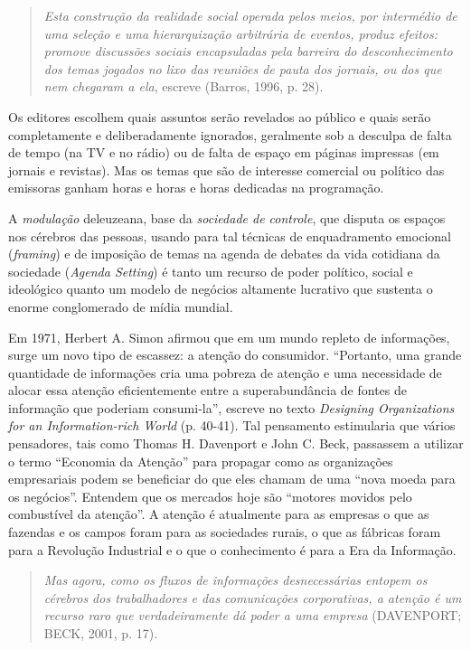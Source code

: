 \begin{quote}
\emph{Esta construção da realidade social operada pelos meios, por
intermédio de uma seleção e uma hierarquização arbitrária de eventos,
produz efeitos: promove discussões sociais encapsuladas pela barreira do
desconhecimento dos temas jogados no lixo das reuniões de pauta dos
jornais, ou dos que nem chegaram a ela}, escreve (Barros, 1996, p. 28).
\end{quote}

Os editores escolhem quais assuntos serão revelados ao público e quais
serão completamente e deliberadamente ignorados, geralmente sob a
desculpa de falta de tempo (na TV e no rádio) ou de falta de espaço em
páginas impressas (em jornais e revistas). Mas os temas que são de
interesse comercial ou político das emissoras ganham horas e horas e
horas dedicadas na programação.

A \emph{modulação} deleuzeana, base da \emph{sociedade de controle}, que
disputa os espaços nos cérebros das pessoas, usando para tal técnicas de
enquadramento emocional (\emph{framing}) e de imposição de temas na
agenda de debates da vida cotidiana da sociedade (\emph{Agenda Setting})
é tanto um recurso de poder político, social e ideológico quanto um
modelo de negócios altamente lucrativo que sustenta o enorme
conglomerado de mídia mundial.

Em 1971, Herbert A. Simon afirmou que em um mundo repleto de
informações, surge um novo tipo de escassez: a atenção do consumidor.
``Portanto, uma grande quantidade de informações cria uma pobreza de
atenção e uma necessidade de alocar essa atenção eficientemente entre a
superabundância de fontes de informação que poderiam consumi-la'',
escreve no texto \emph{Designing Organizations for an Information-rich
World} (p. 40-41). Tal pensamento estimularia que vários pensadores,
tais como Thomas H. Davenport e John C. Beck, passassem a utilizar o
termo ``Economia da Atenção'' para propagar como as organizações
empresariais podem se beneficiar do que eles chamam de uma ``nova moeda
para os negócios''. Entendem que os mercados hoje são ``motores movidos
pelo combustível da atenção''. A atenção é atualmente para as empresas o
que as fazendas e os campos foram para as sociedades rurais, o que as
fábricas foram para a Revolução Industrial e o que o conhecimento é para
a Era da Informação.

\begin{quote}
\emph{Mas agora, como os fluxos de informações desnecessárias entopem os
cérebros dos trabalhadores e das comunicações corporativas, a atenção é
um recurso raro que verdadeiramente dá poder a uma empresa} (DAVENPORT;
BECK, 2001, p. 17).
\end{quote}

